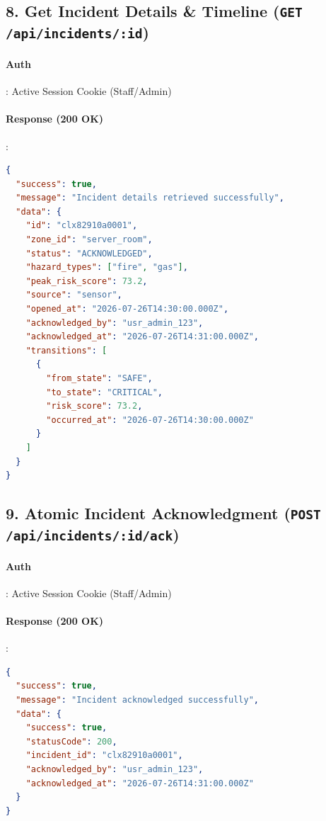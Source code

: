 \documentclass[11pt,a4paper]{article}
\begin{document}
\subsection{8. Get Incident Details \& Timeline (\texttt{GET /api/incidents/:id})}
\paragraph{Auth}: Active Session Cookie (Staff/Admin)

\paragraph{Response (200 OK)}:
\begin{lstlisting}[language=json, samepage=true]
{
  "success": true,
  "message": "Incident details retrieved successfully",
  "data": {
    "id": "clx82910a0001",
    "zone_id": "server_room",
    "status": "ACKNOWLEDGED",
    "hazard_types": ["fire", "gas"],
    "peak_risk_score": 73.2,
    "source": "sensor",
    "opened_at": "2026-07-26T14:30:00.000Z",
    "acknowledged_by": "usr_admin_123",
    "acknowledged_at": "2026-07-26T14:31:00.000Z",
    "transitions": [
      {
        "from_state": "SAFE",
        "to_state": "CRITICAL",
        "risk_score": 73.2,
        "occurred_at": "2026-07-26T14:30:00.000Z"
      }
    ]
  }
}
\end{lstlisting}

\subsection{9. Atomic Incident Acknowledgment (\texttt{POST /api/incidents/:id/ack})}
\paragraph{Auth}: Active Session Cookie (Staff/Admin)

\paragraph{Response (200 OK)}:
\begin{lstlisting}[language=json, samepage=true]
{
  "success": true,
  "message": "Incident acknowledged successfully",
  "data": {
    "success": true,
    "statusCode": 200,
    "incident_id": "clx82910a0001",
    "acknowledged_by": "usr_admin_123",
    "acknowledged_at": "2026-07-26T14:31:00.000Z"
  }
}
\end{lstlisting}
\end{document}
